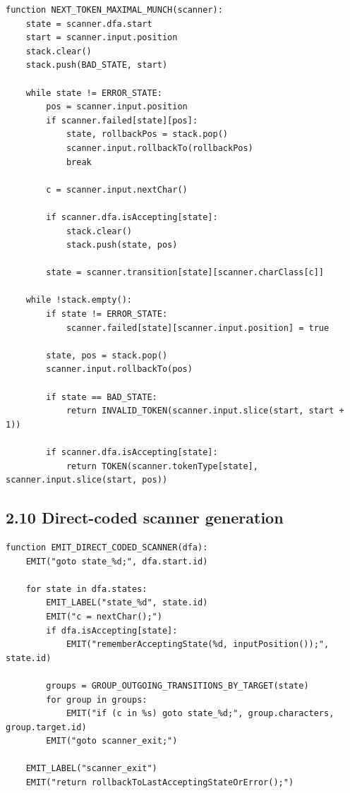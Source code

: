 \documentclass[10pt,letterpaper]{article}
\begin{document}
\begin{verbatim}
function NEXT_TOKEN_MAXIMAL_MUNCH(scanner):
    state = scanner.dfa.start
    start = scanner.input.position
    stack.clear()
    stack.push(BAD_STATE, start)

    while state != ERROR_STATE:
        pos = scanner.input.position
        if scanner.failed[state][pos]:
            state, rollbackPos = stack.pop()
            scanner.input.rollbackTo(rollbackPos)
            break

        c = scanner.input.nextChar()

        if scanner.dfa.isAccepting[state]:
            stack.clear()
            stack.push(state, pos)

        state = scanner.transition[state][scanner.charClass[c]]

    while !stack.empty():
        if state != ERROR_STATE:
            scanner.failed[state][scanner.input.position] = true

        state, pos = stack.pop()
        scanner.input.rollbackTo(pos)

        if state == BAD_STATE:
            return INVALID_TOKEN(scanner.input.slice(start, start + 1))

        if scanner.dfa.isAccepting[state]:
            return TOKEN(scanner.tokenType[state], scanner.input.slice(start, pos))
\end{verbatim}

\subsection*{2.10 Direct-coded scanner generation}
{}

\begin{verbatim}
function EMIT_DIRECT_CODED_SCANNER(dfa):
    EMIT("goto state_%d;", dfa.start.id)

    for state in dfa.states:
        EMIT_LABEL("state_%d", state.id)
        EMIT("c = nextChar();")
        if dfa.isAccepting[state]:
            EMIT("rememberAcceptingState(%d, inputPosition());", state.id)

        groups = GROUP_OUTGOING_TRANSITIONS_BY_TARGET(state)
        for group in groups:
            EMIT("if (c in %s) goto state_%d;", group.characters, group.target.id)
        EMIT("goto scanner_exit;")

    EMIT_LABEL("scanner_exit")
    EMIT("return rollbackToLastAcceptingStateOrError();")
\end{verbatim}
\end{document}
